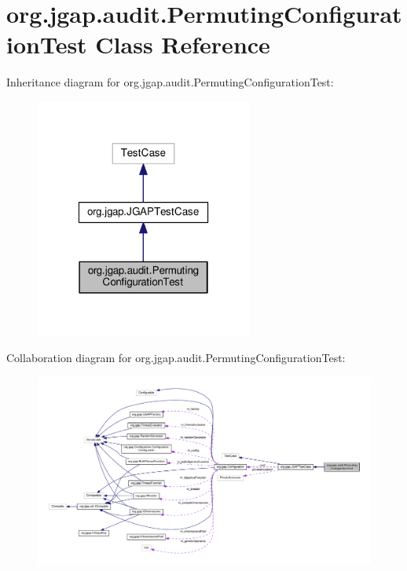 \hypertarget{classorg_1_1jgap_1_1audit_1_1_permuting_configuration_test}{\section{org.\-jgap.\-audit.\-Permuting\-Configuration\-Test Class Reference}
\label{classorg_1_1jgap_1_1audit_1_1_permuting_configuration_test}
}


Inheritance diagram for org.\-jgap.\-audit.\-Permuting\-Configuration\-Test\-:
\nopagebreak
\begin{figure}[H]
\begin{center}
\leavevmode
\includegraphics[width=202pt]{classorg_1_1jgap_1_1audit_1_1_permuting_configuration_test__inherit__graph}
\end{center}
\end{figure}


Collaboration diagram for org.\-jgap.\-audit.\-Permuting\-Configuration\-Test\-:
\nopagebreak
\begin{figure}[H]
\begin{center}
\leavevmode
\includegraphics[width=350pt]{classorg_1_1jgap_1_1audit_1_1_permuting_configuration_test__coll__graph}
\end{center}
\end{figure}
